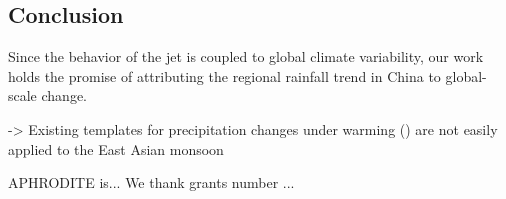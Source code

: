 \documentclass[draft,grl]{AGUTeX}
\begin{document}
\begin{article}
\section{Conclusion}
 Since the behavior of the jet is coupled to global climate variability, our work holds the promise of attributing the regional rainfall trend in China to global-scale change.

-> Existing templates for precipitation changes under warming (\citep{Held2006}\citep{Lintner2007}\citep{Chou2009}) are not easily applied to the East Asian monsoon



\begin{acknowledgments}
APHRODITE is... We thank grants number  ... 
\end{acknowledgments}


\end{article}
\end{document}
